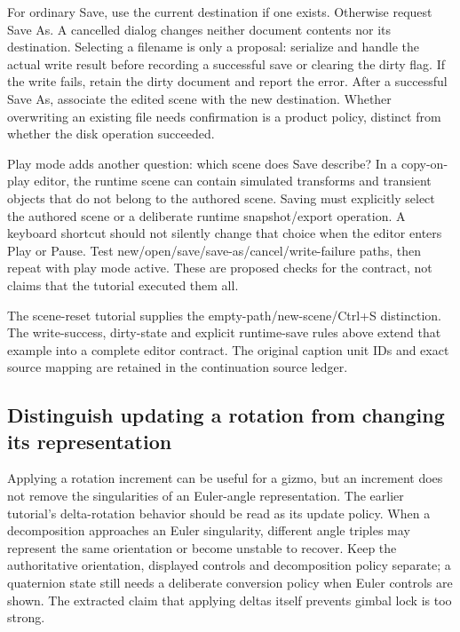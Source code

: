For ordinary Save, use the current destination if one exists. Otherwise request Save As. A cancelled dialog changes neither document contents nor its destination. Selecting a filename is only a proposal: serialize and handle the actual write result before recording a successful save or clearing the dirty flag. If the write fails, retain the dirty document and report the error. After a successful Save As, associate the edited scene with the new destination. Whether overwriting an existing file needs confirmation is a product policy, distinct from whether the disk operation succeeded.

Play mode adds another question: which scene does Save describe? In a copy-on-play editor, the runtime scene can contain simulated transforms and transient objects that do not belong to the authored scene. Saving must explicitly select the authored scene or a deliberate runtime snapshot/export operation. A keyboard shortcut should not silently change that choice when the editor enters Play or Pause. Test new/open/save/save-as/cancel/write-failure paths, then repeat with play mode active. These are proposed checks for the contract, not claims that the tutorial executed them all.

The scene-reset tutorial supplies the empty-path/new-scene/Ctrl+S distinction. The write-success, dirty-state and explicit runtime-save rules above extend that example into a complete editor contract. The original caption unit IDs and exact source mapping are retained in the continuation source ledger.

\subsection{Distinguish updating a rotation from changing its representation}\label{06-engine-ii-ch046-distinguish-updating-a-rotation-from-changing-its-representation}

Applying a rotation increment can be useful for a gizmo, but an increment does not remove the singularities of an Euler-angle representation. The earlier tutorial's delta-rotation behavior should be read as its update policy. When a decomposition approaches an Euler singularity, different angle triples may represent the same orientation or become unstable to recover. Keep the authoritative orientation, displayed controls and decomposition policy separate; a quaternion state still needs a deliberate conversion policy when Euler controls are shown. The extracted claim that applying deltas itself prevents gimbal lock is too strong.

